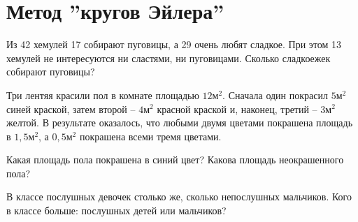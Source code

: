 \section{Метод ''кругов Эйлера''}

\begin{thm}
Из 42 хемулей 17 собирают пуговицы, а 29 очень любят сладкое. При этом 13 хемулей не
интересуются ни сластями, ни пуговицами. Сколько сладкоежек собирают пуговицы?
\end{thm}

\begin{thm}
Три лентяя красили пол в комнате площадью $12м^2$. Сначала один покрасил $5м^2$ синей краской, затем второй – $4м^2$ красной краской и, наконец, третий – $3м^2$ желтой. В результате оказалось, что любыми двумя цветами покрашена площадь в $1,5м^2$, а $0,5м^2$ покрашена всеми тремя цветами. 
\par
Какая площадь пола покрашена в синий цвет? Какова площадь неокрашенного пола?
\end{thm}

\begin{thm}
В классе послушных девочек столько же, сколько непослушных мальчиков. Кого в классе больше: послушных детей или мальчиков?
\end{thm}

